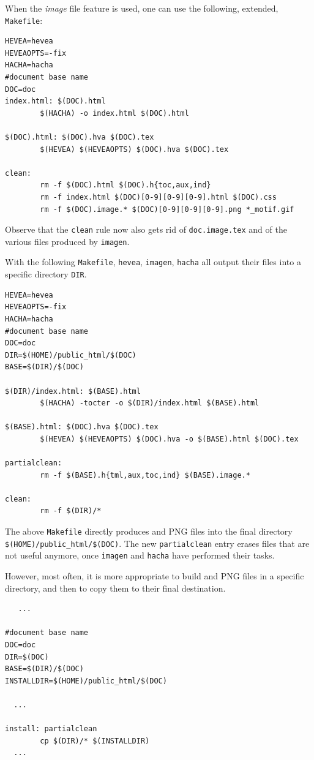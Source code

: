 When the \textit{image} file feature is used, one can use the
following, extended, \texttt{Makefile}:
\begin{verbatim}
HEVEA=hevea
HEVEAOPTS=-fix
HACHA=hacha
#document base name
DOC=doc
index.html: $(DOC).html
        $(HACHA) -o index.html $(DOC).html

$(DOC).html: $(DOC).hva $(DOC).tex
        $(HEVEA) $(HEVEAOPTS) $(DOC).hva $(DOC).tex

clean:
        rm -f $(DOC).html $(DOC).h{toc,aux,ind}
        rm -f index.html $(DOC)[0-9][0-9][0-9].html $(DOC).css
        rm -f $(DOC).image.* $(DOC)[0-9][0-9][0-9].png *_motif.gif
\end{verbatim}
Observe that the \texttt{clean} rule now also gets rid of
\texttt{doc.image.tex} and of the various files produced by
\texttt{imagen}.

With the following \texttt{Makefile},
\texttt{hevea}, \texttt{imagen}, \texttt{hacha} all output their files into
a specific directory \texttt{DIR}.
\begin{verbatim}
HEVEA=hevea
HEVEAOPTS=-fix
HACHA=hacha
#document base name
DOC=doc
DIR=$(HOME)/public_html/$(DOC)
BASE=$(DIR)/$(DOC)

$(DIR)/index.html: $(BASE).html
        $(HACHA) -tocter -o $(DIR)/index.html $(BASE).html

$(BASE).html: $(DOC).hva $(DOC).tex
        $(HEVEA) $(HEVEAOPTS) $(DOC).hva -o $(BASE).html $(DOC).tex

partialclean:
        rm -f $(BASE).h{tml,aux,toc,ind} $(BASE).image.*

clean:
        rm -f $(DIR)/*
\end{verbatim}
The above \texttt{Makefile} directly produces \html{} and PNG files
into the final directory \verb+$(HOME)/public_html/$(DOC)+.
The new \texttt{partialclean} entry erases files that are not
useful anymore, once \texttt{imagen} and \texttt{hacha} have
performed their tasks.

However, most often, it is more appropriate to build \html{} and PNG files
in a specific directory, and then to copy them to their final
destination.
\begin{verbatim}
   ...

#document base name
DOC=doc
DIR=$(DOC)
BASE=$(DIR)/$(DOC)
INSTALLDIR=$(HOME)/public_html/$(DOC)

  ...

install: partialclean
        cp $(DIR)/* $(INSTALLDIR)
  ...
\end{verbatim}

